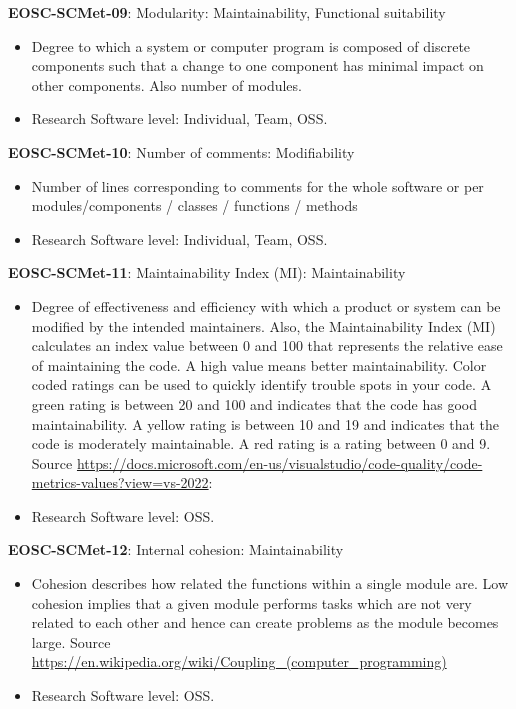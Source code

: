 \textbf{EOSC-SCMet-09}: Modularity: Maintainability, Functional suitability

\begin{itemize}
    \item Degree to which a system or computer program is composed of discrete components such that a change to
one component has minimal impact on other components. Also number of modules. \cite{iso_25010_2011_2017,montagud_systematic_2012,aberdour_achieving_2007,ogasawara_experiences_1996,shepherdson_cessda_2019}
    \item Research Software level: Individual, Team, OSS.
\end{itemize}

\textbf{EOSC-SCMet-10}: Number of comments: Modifiability

\begin{itemize}
    \item Number of lines corresponding to comments for the whole software or per modules/components / classes / functions / methods \cite{srisopha_software_2018,montagud_systematic_2012,ogasawara_experiences_1996}
    \item Research Software level: Individual, Team, OSS.
\end{itemize}

\textbf{EOSC-SCMet-11}: Maintainability Index (MI): Maintainability

\begin{itemize}
    \item Degree of effectiveness and efficiency with which a product or system can be modified by the intended
maintainers. Also, the Maintainability Index (MI) calculates an index value between 0 and 100 that represents the relative ease of maintaining the code. A high value means better maintainability. Color coded ratings can be used to quickly identify trouble spots in your code. A green rating is between 20 and 100 and indicates that the code has good maintainability. A yellow rating is between 10 and 19 and indicates that the code is moderately maintainable. A red rating is a rating between 0 and 9. Source \url{https://docs.microsoft.com/en-us/visualstudio/code-quality/code-metrics-values?view=vs-2022}:  \cite{iso_25010_2011_2017,montagud_systematic_2012}
    \item Research Software level: OSS.
\end{itemize}

\textbf{EOSC-SCMet-12}: Internal cohesion: Maintainability

\begin{itemize}
    \item Cohesion describes how related the functions within a single module are. Low cohesion implies that a given module performs tasks which are not very related to each other and hence can create problems as the module becomes large. Source \url{https://en.wikipedia.org/wiki/Coupling_(computer_programming)} \cite{iso_central_secretary_isoiecieee_2010,montagud_systematic_2012}
    \item Research Software level: OSS.
\end{itemize}

